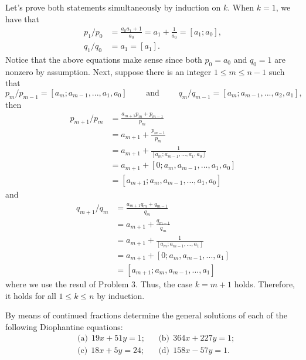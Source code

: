 \begin{solution}
    Let's prove both statements simultaneously by induction on $k$. When $k = 1$, we have that 
    \begin{align*}
        p_1/p_0 &= \frac{a_0a_1 + 1}{a_0} = a_1 + \frac{1}{a_0} = [a_1; a_0], \\
        q_1/q_0 &= a_1 = [a_1].
    \end{align*}
    Notice that the above equations make sense since both $p_0 = a_0$ and $q_0 = 1$ are nonzero by assumption. Next, suppose there is an integer $1 \leq m \leq n-1$ such that 
    $$p_m/p_{m-1} = [a_m; a_{m-1}, ..., a_1, a_0] \qquad \text{ and } \qquad q_m/q_{m-1} = [a_m; a_{m-1}, ..., a_2, a_1],$$
    then 
    \begin{align*}
        p_{m+1}/p_m &= \frac{a_{m+1}p_m + p_{m-1}}{p_m} \\
        &= a_{m+1} + \frac{p_{m-1}}{p_m} \\
        &= a_{m+1} + \frac{1}{[a_m; a_{m-1}, ..., a_1, a_0]} \\
        &= a_{m+1} + [0; a_m, a_{m-1}, ..., a_1, a_0] \\
        &= [a_{m+1}; a_m, a_{m-1}, ..., a_1, a_0]
    \end{align*}
    and
    \begin{align*}
        q_{m+1}/q_m &= \frac{a_{m+1}q_m + q_{m-1}}{q_m} \\
        &= a_{m+1} + \frac{q_{m-1}}{q_m} \\
        &= a_{m+1} + \frac{1}{[a_m; a_{m-1}, ..., a_1]} \\
        &= a_{m+1} + [0; a_m, a_{m-1}, ..., a_1] \\
        &= [a_{m+1}; a_m, a_{m-1}, ..., a_1]
    \end{align*}
    where we use the resul of Problem 3. Thus, the case $k = m+1$ holds. Therefore, it holds for all $1 \leq k \leq n$ by induction. \\
\end{solution}

\begin{exercise}
    By means of continued fractions determine the general solutions of each of the following Diophantine equations:
    \begin{align*}
        &\text{(a)} \ \ 19x + 51y = 1; & &\text{(b)} \ \ 364x + 227y = 1; \\
        &\text{(c)} \ \ 18x + 5y = 24; & &\text{(d)} \ \ 158x - 57y = 1. \\
    \end{align*}
\end{exercise}

